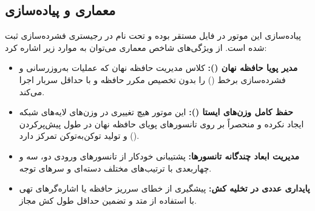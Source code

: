 \subsection{معماری و پیاده‌سازی}
پیاده‌سازی این موتور در فایل  مستقر بوده و تحت نام  در رجیستری فشرده‌سازی ثبت شده است. از ویژگی‌های شاخص معماری می‌توان به موارد زیر اشاره کرد:
\begin{itemize}
    \item \textbf{مدیر پویا حافظه نهان ():} کلاس مدیریت حافظه نهان که عملیات به‌روزرسانی و فشرده‌سازی برخط () را بدون تخصیص مکرر حافظه و با حداقل سربار اجرا می‌کند.
    \item \textbf{حفظ کامل وزن‌های ایستا ():} این موتور هیچ تغییری در وزن‌های لایه‌های شبکه ایجاد نکرده و منحصراً بر روی تانسورهای پویای حافظه نهان  در طول پیش‌پرکردن () و تولید توکن‌به‌توکن تمرکز دارد.
    \item \textbf{مدیریت ابعاد چندگانه تانسورها:} پشتیبانی خودکار از تانسورهای ورودی دو، سه و چهاربعدی با ترتیب‌های مختلف دسته‌ای و سرهای توجه.
    \item \textbf{پایداری عددی در تخلیه کش:} پیشگیری از خطای سرریز حافظه یا اشاره‌گرهای تهی با استفاده از متد  و تضمین حداقل طول کش مجاز.
\end{itemize}
